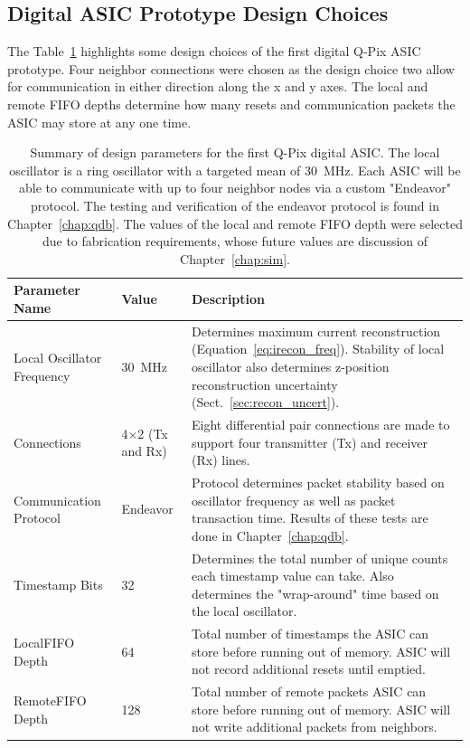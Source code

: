 \subsection{Digital ASIC Prototype Design Choices}
\label{sec:design_choices}
The Table~\ref{table:digital_design_params} highlights some design choices of the first digital Q-Pix ASIC prototype.
Four neighbor connections were chosen as the design choice two allow for communication in either direction along the x and y axes.
The local and remote FIFO depths determine how many resets and communication packets the ASIC may store at any one time.

\begin{table}
\begin{center}
\begin{tabular}{||p{30mm} | p{30mm} | p{90mm}||}
 \hline
 Parameter Name & Value & Description \\ 
 \hline\hline
Local Oscillator Frequency & 30~\unit{MHz} & Determines maximum current reconstruction (Equation~\ref{eq:irecon_freq}). Stability of local oscillator also determines z-position reconstruction uncertainty (Sect.~\ref{sec:recon_uncert}). \\
 \hline
Connections & 4$\times$2 (Tx and Rx) &  Eight differential pair connections are made to support four transmitter (Tx) and receiver (Rx) lines. \\
 \hline
Communication Protocol & Endeavor & Protocol determines packet stability based on oscillator frequency as well as packet transaction time. Results of these tests are done in Chapter~\ref{chap:qdb}. \\
 \hline
Timestamp Bits & 32 & Determines the total number of unique counts each timestamp value can take. Also determines the "wrap-around" time based on the local oscillator.  \\
 \hline
Local\newline FIFO Depth & 64 & Total number of timestamps the ASIC can store before running out of memory. ASIC will not record additional resets until emptied. \\
 \hline
Remote\newline FIFO Depth & 128 & Total number of remote packets ASIC can store before running out of memory. ASIC will not write additional packets from neighbors. \\
 \hline
 \hline
\end{tabular}
\caption{Summary of design parameters for the first Q-Pix digital ASIC.
The local oscillator is a ring oscillator with a targeted mean of 30~\unit{MHz}.
Each ASIC will be able to communicate with up to four neighbor nodes via a custom "Endeavor" protocol.
The testing and verification of the endeavor protocol is found in Chapter~\ref{chap:qdb}.
The values of the local and remote FIFO depth were selected due to fabrication requirements, whose future values are discussion of Chapter~\ref{chap:sim}.
}
\label{table:digital_design_params}
\end{center}
\end{table}

